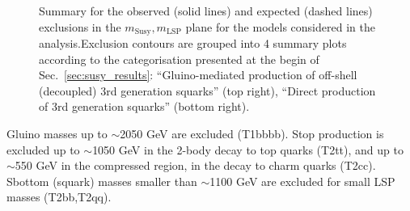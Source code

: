 \begin{figure}[thp!]
    \begin{center}
        \caption{Summary for the observed (solid lines) and expected
            (dashed lines) exclusions in the $m_{\mathrm{Susy}},m_{\mathrm{LSP}}$
            plane for the models considered in the analysis.Exclusion contours
            are grouped into 4 summary plots according to the categorisation
            presented at the begin of Sec.~\ref{sec:susy_results}:
            ``Gluino-mediated production of off-shell (decoupled) 3rd generation
                squarks'' (top right),
            ``Direct production of 3rd generation squarks'' (bottom right).
        \label{fig:summary-excl-plots} }
    \end{center}
\end{figure}

\newpage
Gluino masses up to $\sim$2050 GeV are excluded (T1bbbb). Stop production is
excluded up to $\sim$1050 GeV in the 2-body decay to top quarks (T2tt), and up
to $\sim$550 GeV in the compressed region, in the decay to charm quarks (T2cc).
Sbottom (squark) masses smaller than $\sim$1100 GeV are excluded for small LSP
masses (T2bb,T2qq). %

